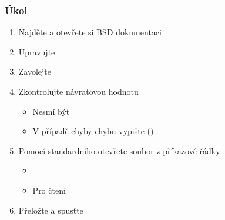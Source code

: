 \begin{frame}
  \frametitle{Úkol}

  \begin{enumerate}
    \item Najděte a otevřete si BSD dokumentaci
    \item Upravujte 
    \item Zavolejte 
    \item Zkontrolujte návratovou hodnotu
    \begin{itemize}
      \item Nesmí být 
      \item V případě chyby chybu vypište ()
    \end{itemize}

    \item Pomocí standardního  otevřete soubor z příkazové řádky
    \begin{itemize}
      \item {}
      \item Pro čtení
    \end{itemize}

    \item Přeložte a spusťte
  \end{enumerate}

\end{frame}

